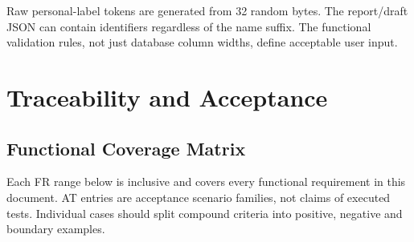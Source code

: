 \documentclass[12pt,a4paper,oneside]{report}
\begin{document}
Raw personal-label tokens are generated from 32 random bytes. The report/draft JSON can contain identifiers regardless of the name suffix. The functional validation rules, not just database column widths, define acceptable user input.

\chapter{Traceability and Acceptance}


\section{Functional Coverage Matrix}

Each FR range below is inclusive and covers every functional requirement in this document. AT entries are acceptance scenario families, not claims of executed tests. Individual cases should split compound criteria into positive, negative and boundary examples.
\end{document}
